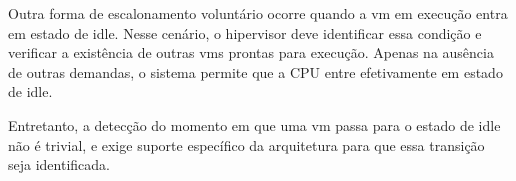 Outra forma de escalonamento voluntário ocorre quando a \gls{vm} em execução entra em estado de idle. Nesse cenário, o hipervisor deve identificar essa condição e verificar a
existência de outras \glspl{vm} prontas para execução. Apenas na ausência de outras demandas, o sistema permite que a CPU entre efetivamente em estado de idle.

Entretanto, a detecção do momento em que uma \gls{vm} passa para o estado de idle não é trivial, e exige suporte específico da arquitetura para que essa transição seja
identificada.






